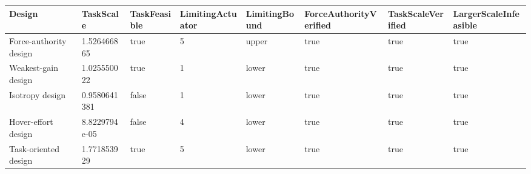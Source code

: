 \begin{tabular}{@{}llllllll@{}}
\toprule
Design & TaskScale & TaskFeasible & LimitingActuator & LimitingBound & ForceAuthorityVerified & TaskScaleVerified & LargerScaleInfeasible \\
\midrule
Force-authority design & 1.526466865 & true & 5 & upper & true & true & true \\
Weakest-gain design & 1.025550022 & true & 1 & lower & true & true & true \\
Isotropy design & 0.9580641381 & false & 1 & lower & true & true & true \\
Hover-effort design & 8.8229794e-05 & false & 4 & lower & true & true & true \\
Task-oriented design & 1.771853929 & true & 5 & lower & true & true & true \\
\bottomrule
\end{tabular}
